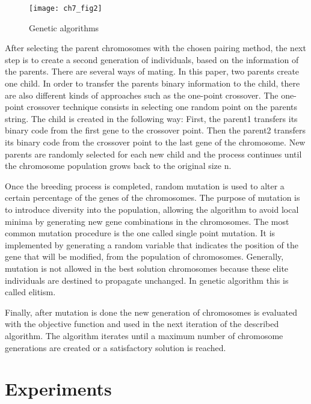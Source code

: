 \begin{figure}[t]
  \centering
  \texttt{[image: ch7\_fig2]}  
  \caption{Genetic algorithms \citep{Haupt2004}}
  \label{fig:7:geneticalgorithms}
\end{figure}
  
After selecting the parent chromosomes with the chosen pairing method, the next step is to create a 
second generation of individuals, based on the information of the parents. There are several ways 
of 
mating. In this paper, two parents create one child. 
In order to transfer the parents binary information to the child, there are also different kinds 
of approaches such as the one-point crossover. The one-point crossover technique consists in 
selecting one random point on the parents string. The child is created in the following way: First, 
the parent1 transfers its binary code from the first gene to the crossover point. Then the parent2 
transfers its binary code from the crossover point to the last gene of the chromosome. New parents 
are randomly selected for each new child and the process continues until the chromosome population 
grows back to the original size n. 

Once the breeding process is completed, random mutation is used to alter a certain percentage of 
the 
genes of the chromosomes. The purpose of mutation is to introduce diversity into the population, 
allowing the algorithm to avoid local minima by generating new gene combinations in the 
chromosomes. 
The most common mutation procedure is the one called single point mutation. It is implemented by 
generating a random variable that indicates the position of the gene that will be modified, from 
the 
population of chromosomes. Generally, mutation is not allowed in the best solution chromosomes 
because these elite individuals are destined to propagate unchanged. In genetic algorithm this 
is called elitism.

Finally, after mutation is done the new generation of chromosomes is evaluated with the objective 
function and used in the next iteration of the described algorithm.
The algorithm iterates until a maximum number of chromosome generations are created or a 
satisfactory solution is reached.


\section{Experiments}
\label{sec:7:results}


